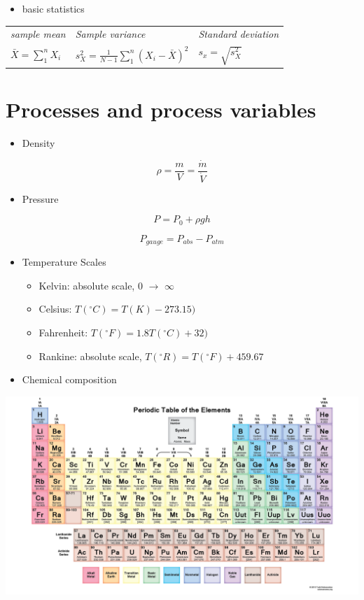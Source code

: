 \documentclass[11pt]{article}
\begin{document}
\begin{itemize}
\item basic statistics
\end{itemize}

\begin{center}
\begin{tabular}{lll}
\emph{sample mean} & \emph{Sample variance} & \emph{Standard deviation}\\
\(\bar{X}=\sum_{1}^{n}X_{i} \) & \(s_{X}^{2}=\frac{1}{N-1}\sum_{1}^{n}(X_{i}-\bar{X})^{2}\) & \(s_{x}=\sqrt{s_{X}^{2}} \)\\
\end{tabular}
\end{center}

\section{Processes and process variables}
\label{sec-2}
\begin{itemize}
\item Density
\end{itemize}

\[\rho =\frac{m}{V}=\frac{\dot{m}}{\dot{V}} \]

\begin{itemize}
\item Pressure
\end{itemize}

\[ P = P_{0} + \rho g h \]

\[ P_{gauge} = P_{abs} - P_{atm} \]

\begin{itemize}
\item Temperature Scales
\begin{itemize}
\item Kelvin: absolute scale, 0 $\to$ $\infty$
\item Celsius: \(T(^{\circ}C) = T(K) - 273.15)\)
\item Fahrenheit: \(T(^{\circ}F) = 1.8 T(^{\circ}C) + 32 )\)
\item Rankine: absolute scale, \(T(^{\circ}R) = T(^{\circ}F)+459.67\)
\end{itemize}
\item Chemical composition
\end{itemize}

\includegraphics[width=.9\linewidth]{./figs/PeriodicTableMuted.png}
\end{document}

